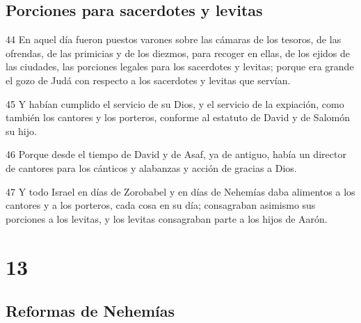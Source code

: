 \section*{Porciones para sacerdotes y levitas}

\par 44 En aquel día fueron puestos varones sobre las cámaras de los tesoros, de las ofrendas, de las primicias y de los diezmos, para recoger en ellas, de los ejidos de las ciudades, las porciones legales para los sacerdotes y levitas; porque era grande el gozo de Judá con respecto a los sacerdotes y levitas que servían.
\par 45 Y habían cumplido el servicio de su Dios, y el servicio de la expiación, como también los cantores y los porteros, conforme al estatuto de David y de Salomón su hijo.
\par 46 Porque desde el tiempo de David y de Asaf, ya de antiguo, había un director de cantores para los cánticos y alabanzas y acción de gracias a Dios.
\par 47 Y todo Israel en días de Zorobabel y en días de Nehemías daba alimentos a los cantores y a los porteros, cada cosa en su día; consagraban asimismo sus porciones a los levitas, y los levitas consagraban parte a los hijos de Aarón.

\chapter{13}

\section*{Reformas de Nehemías}

